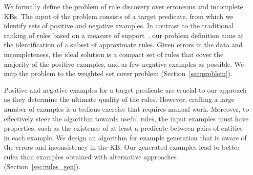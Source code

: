 \vspace{0.5ex}
We formally define the problem of rule discovery over erroneous and incomplete KBs. The input of the problem consists of a target predicate, from which we identify sets of positive and negative examples.  In contrast to the traditional ranking of rules based on a measure of support~\cite{dehaspe1999discovery,galarraga2015fast,schoenmackers2010learning}, our  problem definition aims at the identification of a subset of approximate rules. %
Given errors in the data and incompleteness, the ideal solution is a compact set of rules that cover the majority of the positive examples, and as few negative examples as possible. We map the problem to the %
weighted set cover problem (Section~\ref{sec:problem}).




\vspace{0.5ex}
Positive and negative examples for a target predicate are crucial to our approach as they determine the ultimate quality of the rules. However, crafting a large number of examples is a tedious exercise that requires manual work. Moreover, to effectively steer the algorithm towards useful rules, the input examples must have properties, such as the existence of at least a predicate between pairs of entities in each example. We design an algorithm for example generation that is aware of the errors and inconsistency in the KB. Our generated examples lead to better rules than examples obtained with alternative approaches (Section~\ref{sec:rules_gen}). %


